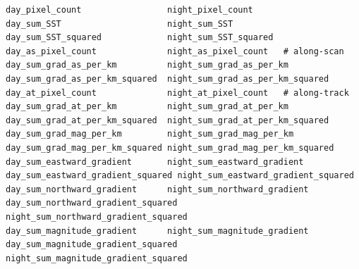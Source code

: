 \documentclass[11pt]{article}
\begin{document}
\begin{lstlisting}
day_pixel_count                 night_pixel_count
day_sum_SST                     night_sum_SST
day_sum_SST_squared             night_sum_SST_squared
day_as_pixel_count              night_as_pixel_count   # along-scan
day_sum_grad_as_per_km          night_sum_grad_as_per_km
day_sum_grad_as_per_km_squared  night_sum_grad_as_per_km_squared
day_at_pixel_count              night_at_pixel_count   # along-track
day_sum_grad_at_per_km          night_sum_grad_at_per_km
day_sum_grad_at_per_km_squared  night_sum_grad_at_per_km_squared
day_sum_grad_mag_per_km         night_sum_grad_mag_per_km
day_sum_grad_mag_per_km_squared night_sum_grad_mag_per_km_squared
day_sum_eastward_gradient       night_sum_eastward_gradient
day_sum_eastward_gradient_squared night_sum_eastward_gradient_squared
day_sum_northward_gradient      night_sum_northward_gradient
day_sum_northward_gradient_squared night_sum_northward_gradient_squared
day_sum_magnitude_gradient      night_sum_magnitude_gradient
day_sum_magnitude_gradient_squared night_sum_magnitude_gradient_squared
\end{lstlisting}
\end{document}

